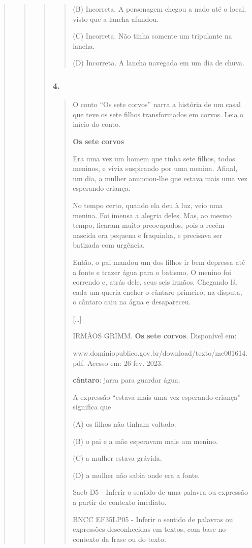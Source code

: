 \begin{quote}
\begin{quote}
\begin{quote}
\begin{quote}
(B) Incorreta. A personagem chegou a nado até o local, visto que a
lancha afundou.

(C) Incorreta. Não tinha somente um tripulante na lancha.

(D) Incorreta. A lancha navegada em um dia de chuva.
\end{quote}

\subsubsection{4. }\label{section-83}

\begin{quote}
O conto ``Os sete corvos'' narra a história de um casal que teve os sete
filhos transformados em corvos. Leia o início do conto.

\textbf{Os sete corvos}

Era uma vez um homem que tinha sete filhos, todos meninos, e vivia
suspirando por uma menina. Afinal, um dia, a mulher anunciou-lhe que
estava mais uma vez esperando criança.

No tempo certo, quando ela deu à luz, veio uma menina. Foi imensa a
alegria deles. Mas, ao mesmo tempo, ficaram muito preocupados, pois a
recém-nascida era pequena e fraquinha, e precisava ser batizada com
urgência.

Então, o pai mandou um dos filhos ir bem depressa até a fonte e trazer
água para o batismo. O menino foi correndo e, atrás dele, seus seis
irmãos. Chegando lá, cada um queria encher o cântaro primeiro; na
disputa, o cântaro caiu na água e desapareceu.

{[}\ldots{}{]}

IRMÃOS GRIMM. \textbf{Os sete corvos}. Disponível em:

www.dominiopublico.gov.br/download/texto/me001614.pdf. Acesso em: 26
fev. 2023.

\textbf{cântaro}: jarra para guardar água.

A expressão ``estava mais uma vez esperando criança'' significa que

(A) os filhos não tinham voltado.

(B) o pai e a mãe esperavam mais um menino.

(C) a mulher estava grávida.

(D) a mulher não sabia onde era a fonte.

Saeb D5 - Inferir o sentido de uma palavra ou expressão a partir do
contexto imediato.

BNCC EF35LP05 - Inferir o sentido de palavras ou expressões
desconhecidas em textos, com base no contexto da frase ou do texto.


\end{quote}
\end{quote}
\end{quote}
\end{quote}
